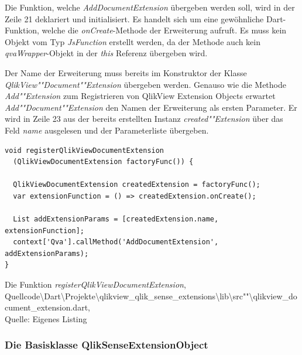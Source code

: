 Die Funktion, welche \textit{AddDocumentExtension} übergeben werden soll, wird in der Zeile 21 deklariert und initialisiert. Es handelt sich um eine gewöhnliche Dart-Funktion, welche die \textit{onCreate}-Methode der Erweiterung aufruft. Es muss kein Objekt vom Typ \textit{JsFunction} erstellt werden, da der Methode auch kein \textit{qvaWrapper}-Objekt in der \textit{this} Referenz übergeben wird.

Der Name der Erweiterung muss bereits im Konstruktor der Klasse \textit{QlikView""Document""Extension} übergeben werden. Genauso wie die Methode \textit{Add""Extension} zum Registrieren von QlikView Extension Objects erwartet \textit{Add""Document""Extension} den Namen der Erweiterung als ersten Parameter. Er wird in Zeile 23 aus der bereits erstellten Instanz \textit{created""Extension} über das Feld \textit{name} ausgelesen und der Parameterliste übergeben.


\ifIncludeFigures\begin{listing}[htbp]
\begin{verbatim}
void registerQlikViewDocumentExtension
  (QlikViewDocumentExtension factoryFunc()) {
  
  QlikViewDocumentExtension createdExtension = factoryFunc();
  var extensionFunction = () => createdExtension.onCreate();

  List addExtensionParams = [createdExtension.name, extensionFunction];
  context['Qva'].callMethod('AddDocumentExtension', addExtensionParams);
}
\end{verbatim}
\caption[Die Funktion \textit{registerQlikViewDocumentExtension}]{Die Funktion \textit{registerQlikViewDocumentExtension}, \\Quellcode\textbackslash{}Dart\textbackslash{}Projekte\textbackslash{}qlikview\_qlik\_sense\_extensions\textbackslash{}lib\textbackslash{}src""\textbackslash{}qlikview\_document\_extension.dart, \\Quelle: Eigenes Listing}
\label{lst:registerQlikViewDocumentExtension}
\end{listing}\fi


\subsubsection{Die Basisklasse QlikSenseExtensionObject}
\label{lab:DieBasisklasseQlikSenseExtensionObject}


